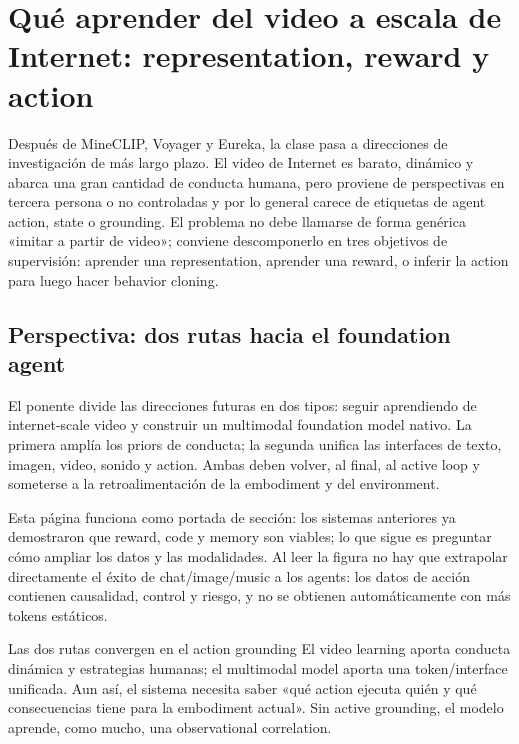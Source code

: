 \section{Qué aprender del video a escala de Internet: representation, reward y action}

Después de MineCLIP, Voyager y Eureka, la clase pasa a direcciones de investigación de más largo plazo. El video de Internet es barato, dinámico y abarca una gran cantidad de conducta humana, pero proviene de perspectivas en tercera persona o no controladas y por lo general carece de etiquetas de agent action, state o grounding. El problema no debe llamarse de forma genérica «imitar a partir de video»; conviene descomponerlo en tres objetivos de supervisión: aprender una representation, aprender una reward, o inferir la action para luego hacer behavior cloning.

\subsection{Perspectiva: dos rutas hacia el foundation agent}

El ponente divide las direcciones futuras en dos tipos: seguir aprendiendo de internet-scale video y construir un multimodal foundation model nativo. La primera amplía los priors de conducta; la segunda unifica las interfaces de texto, imagen, video, sonido y action. Ambas deben volver, al final, al active loop y someterse a la retroalimentación de la embodiment y del environment.


Esta página funciona como portada de sección: los sistemas anteriores ya demostraron que reward, code y memory son viables; lo que sigue es preguntar cómo ampliar los datos y las modalidades. Al leer la figura no hay que extrapolar directamente el éxito de chat/image/music a los agents: los datos de acción contienen causalidad, control y riesgo, y no se obtienen automáticamente con más tokens estáticos.


\begin{importantbox}{Las dos rutas convergen en el action grounding}
El video learning aporta conducta dinámica y estrategias humanas; el multimodal model aporta una token/interface unificada. Aun así, el sistema necesita saber «qué action ejecuta quién y qué consecuencias tiene para la embodiment actual». Sin active grounding, el modelo aprende, como mucho, una observational correlation.
\end{importantbox}

